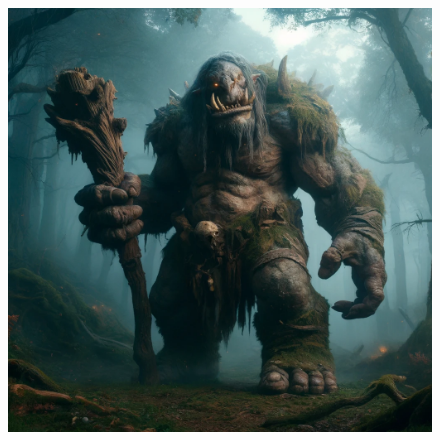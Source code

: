 \begin{figure}[h]
\begin{center}
\includegraphics[scale=0.24]{img/ai-images/troll.png}
\end{center}
\end{figure}
